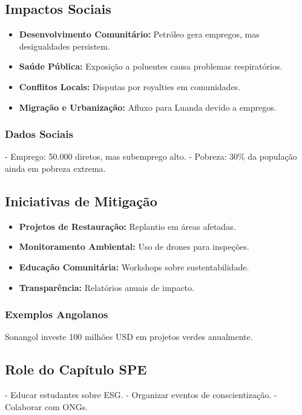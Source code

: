 \documentclass[12pt]{article}
\begin{document}
\subsection{Impactos Sociais}
\begin{itemize}
    \item \textbf{Desenvolvimento Comunitário:} Petróleo gera empregos, mas desigualdades persistem.
    \item \textbf{Saúde Pública:} Exposição a poluentes causa problemas respiratórios.
    \item \textbf{Conflitos Locais:} Disputas por royalties em comunidades.
    \item \textbf{Migração e Urbanização:} Afluxo para Luanda devido a empregos.
\end{itemize}

\subsubsection{Dados Sociais}
- Emprego: 50.000 diretos, mas subemprego alto.
- Pobreza: 30\% da população ainda em pobreza extrema.

\subsection{Iniciativas de Mitigação}
\begin{itemize}
    \item \textbf{Projetos de Restauração:} Replantio em áreas afetadas.
    \item \textbf{Monitoramento Ambiental:} Uso de drones para inspeções.
    \item \textbf{Educação Comunitária:} Workshops sobre sustentabilidade.
    \item \textbf{Transparência:} Relatórios anuais de impacto.
\end{itemize}

\subsubsection{Exemplos Angolanos}
Sonangol investe 100 milhões USD em projetos verdes anualmente.

\subsection{Role do Capítulo SPE}
- Educar estudantes sobre ESG.
- Organizar eventos de conscientização.
- Colaborar com ONGs.
\end{document}

